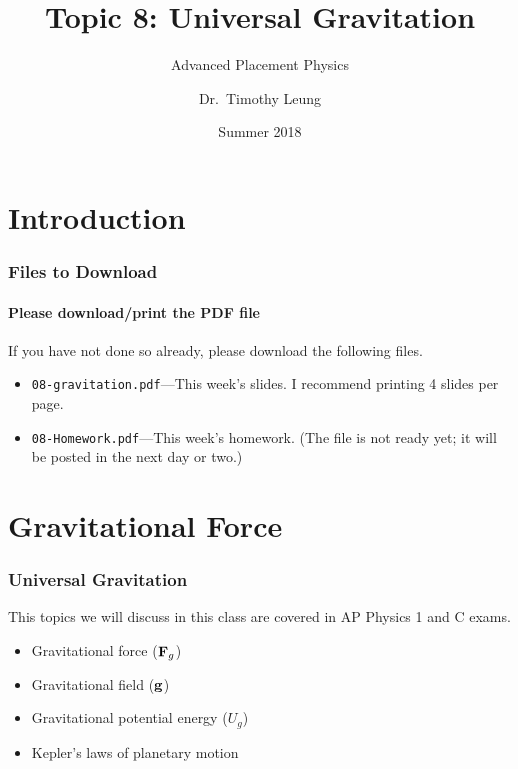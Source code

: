 \documentclass[12pt,compress,aspectratio=169]{beamer}
\title{Topic 8: Universal Gravitation}
\subtitle{Advanced Placement Physics}
\author[TML]{Dr.\ Timothy Leung}
\institute{Olympiads School}
\date{Summer 2018}
\newcommand{\mb}[1]{\ensuremath\mathbf{#1}}
\begin{document}
\begin{frame}
  \maketitle
\end{frame}


\section[Intro]{Introduction}

\begin{frame}
  \frametitle{Files to Download}
  \framesubtitle{Please download/print the PDF file}
  If you have not done so already, please download the following files.
  \begin{itemize}
  \item\texttt{08-gravitation.pdf}---This week's
    slides. I recommend printing 4 slides per page.
  \item\texttt{08-Homework.pdf}---This week's homework. (The file is not ready
    yet; it will be posted in the next day or two.)
  \end{itemize}
\end{frame}





\section{Gravitational Force}
\begin{frame}
  \frametitle{Universal Gravitation}
  This topics we will discuss in this class are covered in AP Physics 1 and
  C exams.
  \begin{itemize}
  \item Gravitational force ($\mb{F}_g$)
  \item Gravitational field ($\mb{g}$)
  \item Gravitational potential energy  ($U_g$)
  \item Kepler's laws of planetary motion
  \end{itemize}
\end{frame}
\end{document}
